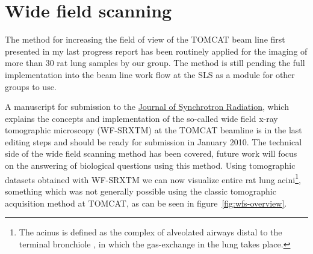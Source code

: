 \documentclass[a4paper,twoside,DIV=calc]{scrartcl}
\begin{document}
\section{Wide field scanning}\label{sec:wfs}
The method for increasing the field of view of the TOMCAT beam line first presented in my last progress report has been routinely applied for the imaging of more than 30 rat lung samples by our group. The method is still pending the full implementation into the beam line work flow at the SLS as a module for other groups to use.

A manuscript for submission to the \href{http://journals.iucr.org/s/}{Journal of Synchrotron Radiation}, which explains the concepts and implementation of the so-called wide field x-ray tomographic microscopy (WF-SRXTM) at the TOMCAT beamline is in the last editing steps and should be ready for submission in January 2010. The technical side of the wide field scanning method has been covered, future work will focus on the answering of biological questions using this method. Using tomographic datasets obtained with WF-SRXTM we can now visualize entire rat lung acini\footnote{The acinus is defined as the complex of alveolated airways distal to the terminal bronchiole \cite{Rodriguez1987}, in which the gas-exchange in the lung takes place.}, something which was not generally possible using the classic tomographic acquisition method at TOMCAT, as can be seen in figure~\ref{fig:wfs-overview}.
\end{document}
